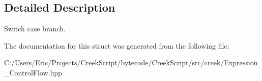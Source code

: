 \subsection{Detailed Description}
Switch case branch. 

The documentation for this struct was generated from the following file\+:\begin{DoxyCompactItemize}
\item 
C\+:/\+Users/\+Eric/\+Projects/\+Creek\+Script/bytecode/\+Creek\+Script/src/creek/Expression\+\_\+\+Control\+Flow.\+hpp\end{DoxyCompactItemize}
